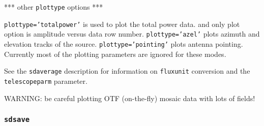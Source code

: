     *** other {\tt plottype} options ***

    {\tt plottype='totalpower'} is used to plot the total power data.
    and only plot option is amplitude versus data row number.
    {\tt plottype='azel'} plots azimuth and elevation tracks of the source.
    {\tt plottype='pointing'} plots antenna pointing.
    Currently most of the plotting parameters are ignored for these modes.

    See the {\tt sdaverage} description for information on {\tt fluxunit} 
    conversion and the {\tt telescopeparm} parameter.

    WARNING: be careful plotting OTF (on-the-fly) mosaic data with 
    lots of fields!

 
\subsubsection{{\tt sdsave}}
\label{section:sd.sdtasks.tasks.sdsave}

